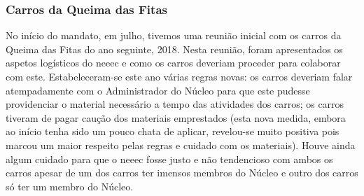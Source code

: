 
\subsubsection{Carros da Queima das Fitas}

No início do mandato, em julho, tivemos uma reunião inicial com os carros da Queima das Fitas do ano seguinte, 2018. Nesta reunião, foram apresentados os aspetos logísticos do \acrshort{neeec} e como os carros deveriam proceder para colaborar com este. Estabeleceram-se este ano várias regras novas: os carros deveriam falar atempadamente com o Administrador do Núcleo para que este pudesse providenciar o material necessário a tempo das atividades dos carros; os carros tiveram de pagar caução dos materiais emprestados (esta nova medida, embora ao início tenha sido um pouco chata de aplicar, revelou-se muito positiva pois marcou um maior respeito pelas regras e cuidado com os materiais). Houve ainda algum cuidado para que o \acrshort{neeec} fosse justo e não tendencioso com ambos os carros apesar de um dos carros ter imensos membros do Núcleo e outro dos carros só ter um membro do Núcleo.

